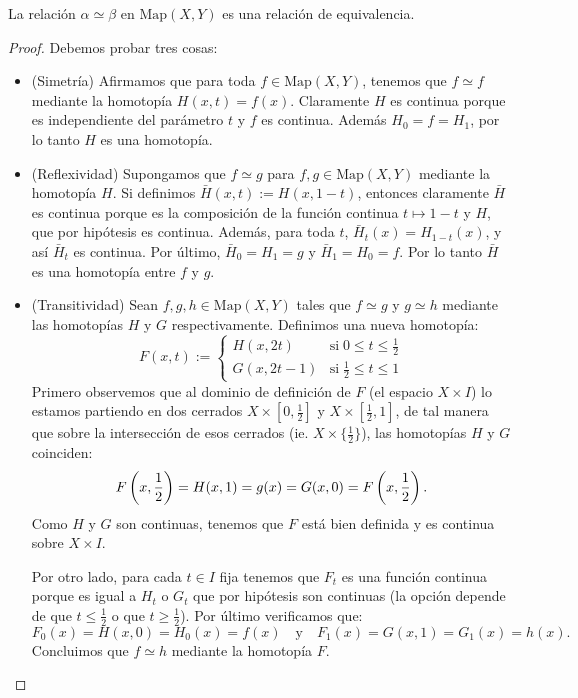 
\begin{ejercicio}
La relaci\'on $\alpha\simeq\beta$ en $\text{Map}(X,Y)$ es una relaci\'on de equivalencia.
\end{ejercicio}
\begin{proof}%

Debemos probar tres cosas:
\begin{itemize}
	\item(Simetr\'ia) Afirmamos que para toda $f\in\text{Map}(X,Y)$, tenemos que $f\simeq f$
	mediante la homotop\'ia $H(x,t)=f(x)$. Claramente $H$ es continua porque es independiente
	del par\'ametro $t$ y $f$ es continua. Adem\'as $H_0=f=H_1$, por lo tanto $H$ es una
	homotop\'ia.
	
	\item(Reflexividad) Supongamos que $f \simeq g$ para $f,g\in\text{Map}(X,Y)$
	mediante la homotop\'ia $H$. Si definimos $\bar{H}(x,t):=H(x,1-t)$, entonces claramente
	$\bar{H}$ es continua porque es la composici\'on de la funci\'on continua $t\mapsto 1-t$
	y $H$, que por hip\'otesis es continua. Adem\'as, para toda $t$, $\bar{H}_t(x)=H_{1-t}(x)$,
	y as\'i $\bar{H}_t$ es continua. Por \'ultimo, $\bar{H}_0=H_1=g$ y $\bar{H}_1=H_0=f$. Por
	lo tanto $\bar{H}$ es una homotop\'ia entre $f$ y $g$.
	
	\item(Transitividad) Sean $f,g,h\in\text{Map}(X,Y)$ tales que $f\simeq g$
	y $g\simeq h$ mediante las homotop\'ias $H$ y $G$ respectivamente. Definimos una nueva
	homotop\'ia:
	\[
		F(x,t):=
		\begin{cases}
			H(x,2t) & \text{si}\; 0\leq t\leq \frac{1}{2} \\
			G(x,2t-1) & \text{si}\; \frac{1}{2} \leq t \leq 1
		\end{cases}
	\]
	Primero observemos que al dominio de definici\'on de $F$ (el espacio $X\times I$) lo
	estamos partiendo en dos cerrados $X\times[0,\tfrac{1}{2}]$ y $X\times[\tfrac{1}{2},1]$,
	de tal manera que sobre la intersecci\'on de esos cerrados (ie. $X\times\{\frac{1}{2}\}$),
	las homotop\'ias $H$ y $G$ coinciden:
	\[
		F\left( x,\frac{1}{2} \right)=H(x,1)=g(x)=G(x,0)=F\left( x,\frac{1}{2} \right).
	\]
	Como $H$ y $G$ son continuas, tenemos que $F$ est\'a bien definida y es continua sobre
	$X\times I$.
	
	Por otro lado, para cada $t\in I$ fija tenemos que $F_t$ es una funci\'on continua porque
	es igual a $H_t$ o $G_t$ que por hip\'otesis son continuas (la opci\'on depende de que
	$t\leq\tfrac{1}{2}$ o que $t\geq\tfrac{1}{2}$). Por \'ultimo verificamos que:
	\[
		F_0(x)=H(x,0)=H_0(x)=f(x) \quad\text{y}\quad F_1(x)=G(x,1)=G_1(x)=h(x).
	\]
	Concluimos que $f\simeq h$ mediante la homotop\'ia $F$.
\end{itemize}

\end{proof}%

